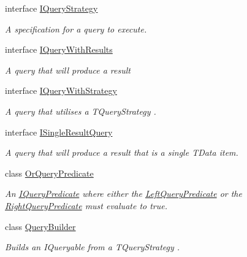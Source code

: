 \begin{DoxyCompactItemize}
interface \hyperlink{interfaceCqrs_1_1Repositories_1_1Queries_1_1IQueryStrategy}{I\+Query\+Strategy}
\begin{DoxyCompactList}\small\item\em A specification for a query to execute. \end{DoxyCompactList}\item 
interface \hyperlink{interfaceCqrs_1_1Repositories_1_1Queries_1_1IQueryWithResults}{I\+Query\+With\+Results}
\begin{DoxyCompactList}\small\item\em A query that will produce a result \end{DoxyCompactList}\item 
interface \hyperlink{interfaceCqrs_1_1Repositories_1_1Queries_1_1IQueryWithStrategy}{I\+Query\+With\+Strategy}
\begin{DoxyCompactList}\small\item\em A query that utilises a {\itshape T\+Query\+Strategy} . \end{DoxyCompactList}\item 
interface \hyperlink{interfaceCqrs_1_1Repositories_1_1Queries_1_1ISingleResultQuery}{I\+Single\+Result\+Query}
\begin{DoxyCompactList}\small\item\em A query that will produce a result that is a single {\itshape T\+Data}  item. \end{DoxyCompactList}\item 
class \hyperlink{classCqrs_1_1Repositories_1_1Queries_1_1OrQueryPredicate}{Or\+Query\+Predicate}
\begin{DoxyCompactList}\small\item\em An \hyperlink{interfaceCqrs_1_1Repositories_1_1Queries_1_1IQueryPredicate}{I\+Query\+Predicate} where either the \hyperlink{classCqrs_1_1Repositories_1_1Queries_1_1OrQueryPredicate_afd9d98db1920b798bded515a27f0eeb6_afd9d98db1920b798bded515a27f0eeb6}{Left\+Query\+Predicate} or the \hyperlink{classCqrs_1_1Repositories_1_1Queries_1_1OrQueryPredicate_ae1a81d19657bee8735a977b247fef4d0_ae1a81d19657bee8735a977b247fef4d0}{Right\+Query\+Predicate} must evaluate to true. \end{DoxyCompactList}\item 
class \hyperlink{classCqrs_1_1Repositories_1_1Queries_1_1QueryBuilder}{Query\+Builder}
\begin{DoxyCompactList}\small\item\em Builds an I\+Queryable from a {\itshape T\+Query\+Strategy} . \end{DoxyCompactList}\item 

\end{DoxyCompactItemize}
